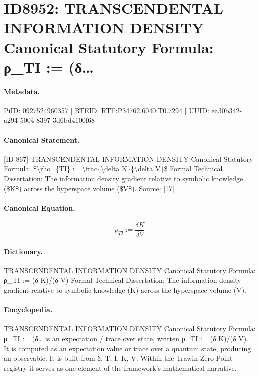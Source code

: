 \section*{ID8952: TRANSCENDENTAL INFORMATION DENSITY Canonical Statutory Formula: ρ\_TI := (δ…}
\paragraph{Metadata.}
PiID: 0927524960357 | RTEID: RTE:P34762.6040:T0.7294 | UUID: ea30b342-a294-5004-8397-3d6bd4100f68

\paragraph{Canonical Statement.}
[ID 867] TRANSCENDENTAL INFORMATION DENSITY Canonical Statutory Formula: \$\textbackslash{}rho\_\{TI\} := \textbackslash{}frac\{\textbackslash{}delta K\}\{\textbackslash{}delta V\}\$ Formal Technical Dissertation: The information density gradient relative to symbolic knowledge (\$K\$) across the hyperspace volume (\$V\$). Source: [17]

\paragraph{Canonical Equation.}
\[
\rho_{TI} := \frac{\delta K}{\delta V}
\]

\paragraph{Dictionary.}
TRANSCENDENTAL INFORMATION DENSITY Canonical Statutory Formula: ρ\_TI := (δ K)/(δ V) Formal Technical Dissertation: The information density gradient relative to symbolic knowledge (K) across the hyperspace volume (V).

\paragraph{Encyclopedia.}
TRANSCENDENTAL INFORMATION DENSITY Canonical Statutory Formula: ρ\_TI := (δ… is an expectation / trace over state, written ρ\_TI := (δ K)/(δ V). It is computed as an expectation value or trace over a quantum state, producing an observable. It is built from δ, T, I, K, V. Within the Trawin Zero Point registry it serves as one element of the framework's mathematical narrative.
